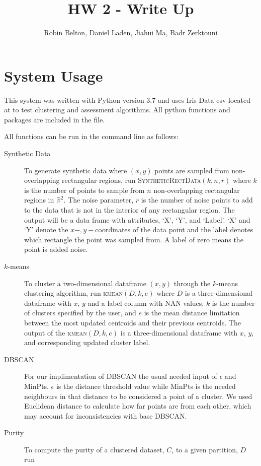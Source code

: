 \documentclass[psamsfonts,onesided,10pt]{amsart}
\title{HW 2 - Write Up}
\author{Robin Belton, Daniel Laden, Jiahui Ma,  Badr Zerktouni}
\begin{document}
\maketitle

\section{System Usage}

This system was written with Python version 3.7 and uses Iris Data csv located at  
to test clustering and assessment algorithms. All python functions and packages are included in the  file.

All functions can be run in the command line as follows:

\begin{description}
\item[Synthetic Data] To generate synthetic data where $(x,y)$ points are sampled from 
non-overlapping rectangular regions, run \textsc{SyntheticRectData}$(k,n,r)$ where $k$ is the 
number of points to sample from $n$ non-overlapping rectangular regions in $\mathbb{R}^2$. 
The noise parameter, $r$  is the number of noise points to add to the data that is not in the interior 
of any rectangular region. The output will be a data frame with attributes, `X', `Y', and `Label'. 
`X' and `Y' denote the $x-,y-$coordinates of the data point and the label denotes which rectangle 
the point was sampled from. A label of zero means the point is added noise.
\item[$k$-means] To cluster a two-dimensional dataframe $(x,y)$ through the $k$-means 
clustering algorithm, run \textsc{kmean}$(D,k,e)$ where $D$ is a three-dimensional dataframe with 
$x$, $y$ and a label column with NAN values, $k$ is the number of clusters specified by the user, 
and $e$ is the mean distance limitation between the most updated centroids and their previous 
centroids. The output of the \textsc{kmean}$(D,k,e)$ is a three-dimensional dataframe with $x$, $y$, 
and corresponding updated cluster label.
\item[DBSCAN] For our implimentation of DBSCAN the usual needed input of $\epsilon$ and MinPts. $\epsilon$ is the distance threshold value while MinPts is the needed neighbours in that distance to be considered a point of a cluster. We used Euclidean distance to calculate how far points are from each other, which may account for inconsistencies with base DBSCAN.
\item[Purity]  To compute the purity of a clustered dataset, $C$, to a given partition, $D$ run 

\end{description}
\end{document}
